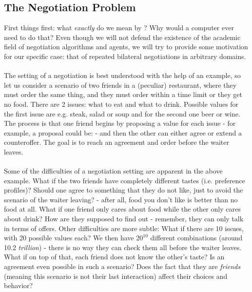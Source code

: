 \subsection*{The Negotiation Problem}	\label{sec:introduction.the_negotiation_problem}
    First things first: what \emph{exactly} do we mean by ? Why would a computer ever need to do that? Even though we will not defend the existence of the academic field of negotiation algorithms and agents, we will try to provide some motivation for our specific case: that of repeated bilateral negotiations in arbitrary domains.

    \paragraph*{}
        The setting of a negotiation is best understood with the help of an example, so let us consider a scenario of two friends in a (peculiar) restaurant, where they must order the same thing, and they must order within a time limit or they get no food. There are 2 issues: what to eat and what to drink. Possible values for the first issue are e.g. steak, salad or soup and for the second one beer or wine. The process is that one friend begins by proposing a value for each issue - for example, a proposal could be:  - and then the other can either agree or extend a counteroffer. The goal is to reach an agreement and order before the waiter leaves.
    
    \paragraph*{}
        Some of the difficulties of a negotiation setting are apparent in the above example. What if the two friends have completely different tastes (i.e. preference profiles)? Should one agree to something that they do not like, just to avoid the scenario of the waiter leaving? - after all, food you don't like is better than no food at all. What if one friend only cares about food while the other only cares about drink? How are they supposed to find out - remember, they can only talk in terms of offers.
        Other difficulties are more subtle: What if there are 10 issues, with 20 possible values each? We then have $20^{10}$ different combinations (around 10.2 \emph{trillion}) - there is no way they can check them all before the waiter leaves. What if on top of that, each friend does not know the other's taste? Is an agreement even possible in such a scenario? Does the fact that they are \emph{friends} (meaning this scenario is not their last interaction) affect their choices and behavior?

